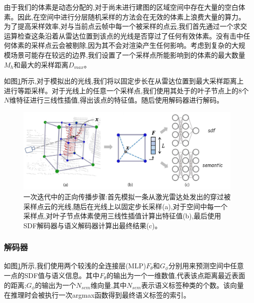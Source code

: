 由于我们的体素是动态分配的,对于尚未进行建图的区域空间中存在大量的空白体素。因此,在空间中进行分层随机采样的方法会在无效的体素上浪费大量的算力。为了提高采样效率,对与当前点云帧中每一个被采样的点云,我们首先通过一个求交运算检查这条沿着从雷达位置到该点的光线是否穿过了任何有效体素。没有击中任何体素的采样点云会被剔除,因为其不会对渲染产生任何影响。考虑到复杂的大规模场景可能存在较远的边界,我们设置了一个采样点所能影响到的体素的最大数量$M_h$和最大的采样距离$D_{max}$。

如图\ref{shinemapping}所示,对于模拟出的光线,我们将以固定步长在从雷达位置到最大采样距离上进行等距采样。对于光线上的任意一个采样点,我们使用其处于的叶子节点上的8个$N$维特征进行三线性插值,得出该点的特征值。随后使用解码器进行解码。
\begin{figure}[htbp]
    \includegraphics[scale = 0.3]{figures/shinemapping.png}
    \centering
    \caption{一次迭代中的正向传播步骤:首先模拟一条从激光雷达处发出的穿过被采样点云的光线,随后在光线上以固定步长采样(a),对于空间中每一个采样点,对叶子节点体素使用三线性插值计算出特征值(b),最后使用SDF解码器与语义解码器计算出最终结果(c)。}\label{shinemapping}
\end{figure}
\subsubsection{解码器}
如图\ref{shinemapping}所示,我们使用两个较浅的全连接层(MLP)$F_\theta$和$G_\phi$分别用来预测空间中任意一点的SDF值与语义信息。其中$F_\theta$的输出为一个一维数值,代表该点距离最近表面的距离;$G_\phi$的输出为一个$N_{sem}$维向量,其中$N_{sem}$表示语义标签种类的个数。该向量在推理时会被执行一次argmax函数得到最终语义标签的索引。
